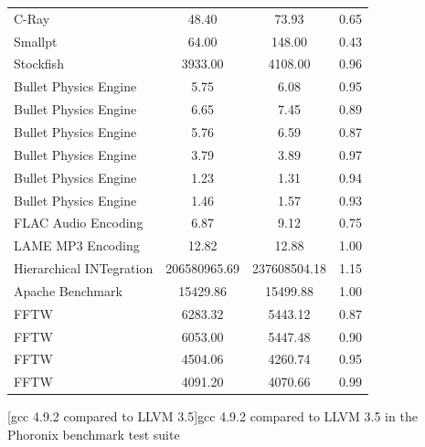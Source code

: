 \begin{appendix}
\begin{table}[htbp]
\begin{longtable}{l|c|c|c}
        C-Ray & 48.40 & 73.93 & 0.65 \\
        Smallpt & 64.00 & 148.00 & 0.43 \\
        Stockfish & 3933.00 & 4108.00 & 0.96 \\
        Bullet Physics Engine & 5.75 & 6.08 & 0.95 \\
        Bullet Physics Engine & 6.65 & 7.45 & 0.89 \\
        Bullet Physics Engine & 5.76 & 6.59 & 0.87 \\
        Bullet Physics Engine & 3.79 & 3.89 & 0.97 \\
        Bullet Physics Engine & 1.23 & 1.31 & 0.94 \\
        Bullet Physics Engine & 1.46 & 1.57 & 0.93 \\
        FLAC Audio Encoding & 6.87 & 9.12 & 0.75 \\
        LAME MP3 Encoding & 12.82 & 12.88 & 1.00 \\
        Hierarchical INTegration & 206580965.69 & 237608504.18 & 1.15 \\
        Apache Benchmark & 15429.86 & 15499.88 & 1.00 \\
        FFTW & 6283.32 & 5443.12 & 0.87 \\
        FFTW & 6053.00 & 5447.48 & 0.90 \\
        FFTW & 4504.06 & 4260.74 & 0.95 \\
        FFTW & 4091.20 & 4070.66 & 0.99 \\
        \hline
    \end{longtable}
    [\ac{gcc} 4.9.2 compared to \ac{LLVM} 3.5]{\ac{gcc} 4.9.2 compared to \ac{LLVM} 3.5 in the Phoronix benchmark test suite\cite{LLVMvsGCC}}
    \label{table:llvmvsgcc}
\end{table}


\end{appendix}
